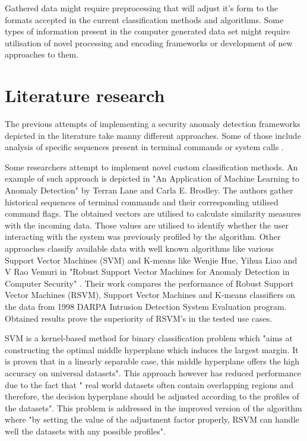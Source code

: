 \documentclass[a4paper,twoside,12pt]{book}
\begin{document}
Gathered data might require preprocessing that will adjust it's form to the formats accepted in the
current classification methods and algorithms. Some types of information present in the computer 
generated data set might require utilisation of novel processing and encoding frameworks or 
development of new approaches to them.  

\section{Literature research}

The previous attempts of implementing a security anomaly detection frameworks depicted in the 
literature take manny different approaches. Some of those include analysis of specific sequences
present in terminal commands \cite{bib:lane1997application} or system calls \cite{bib:forest}. 

Some researchers attempt to implement novel custom classification methods. An example of such 
approach is depicted in "An Application of Machine Learning to Anomaly Detection" by Terran Lane 
and Carla E. Brodley\cite{bib:lane1997application}. The authors gather historical sequences of
terminal commands and their corresponding utilised command flags. The obtained vectors are utilised
to calculate similarity measures with the incoming data. Those values are utilised to identify 
whether the user interacting with the system was previously profiled by the algorithm.
Other approaches classify available data with well known algorithms like various Support Vector 
Machines (SVM) and K-means like Wenjie Hue, Yihua Liao and V Rao Vemuri in "Robust Support Vector 
Machines for Anomaly Detection in Computer Security" \cite{bib:rsvm}. Their work compares the 
performance of Robust Support Vector Machines (RSVM), Support Vector Machines and K-means classifiers
on the data from 1998 DARPA Intrusion Detection System Evaluation program. Obtained results
prove the superiority of RSVM's in the tested use cases. 

SVM is a kernel-based method for binary classification problem which "aims at constructing 
the optimal middle hyperplane which induces the largest margin. It is proven that in a linearly 
separable case, this middle hyperplane offers the high accuracy on universal datasets". This 
approach however has reduced performance due to the fact that " real world datasets often contain 
overlapping regions and therefore, the decision hyperplane should be adjusted according to the 
profiles of the datasets". This problem is addressed in the improved version of the algorithm
where "by setting the value of the adjustment factor properly, RSVM can handle well the datasets 
with any possible profiles"\cite{bib:svmandrsvm}.
\end{document}
